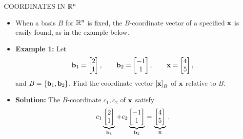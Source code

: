 \begin{frame}[shrink=12]{COORDINATES IN $\mathbb{R}^n$}
\begin{itemize}
\item When a basis $B$ for $\mathbb{R}^n$ is fixed, the $B$-coordinate vector of a specified $\mathbf{x}$ is easily found, as in the example below.
\item \textbf{Example 1:} Let
\[
\mathbf{b}_1=\begin{bmatrix}2\\1\end{bmatrix},\qquad
\mathbf{b}_2=\begin{bmatrix}-1\\1\end{bmatrix},\qquad
\mathbf{x}=\begin{bmatrix}4\\5\end{bmatrix},
\]
and $B=\{\mathbf{b}_1,\mathbf{b}_2\}$. Find the coordinate vector $\left[\mathbf{x}\right]_{B}$ of $\mathbf{x}$ relative to $B$.
\item \textbf{Solution:} The $B$-coordinate $c_1,c_2$ of $\mathbf{x}$ satisfy
\[
c_1\underbrace{\begin{bmatrix}2\\1\end{bmatrix}}_{\mathbf{b}_1}
+c_2\underbrace{\begin{bmatrix}-1\\1\end{bmatrix}}_{\mathbf{b}_2}
=\underbrace{\begin{bmatrix}4\\5\end{bmatrix}}_{\mathbf{x}}.
\]
\end{itemize}
\end{frame}

